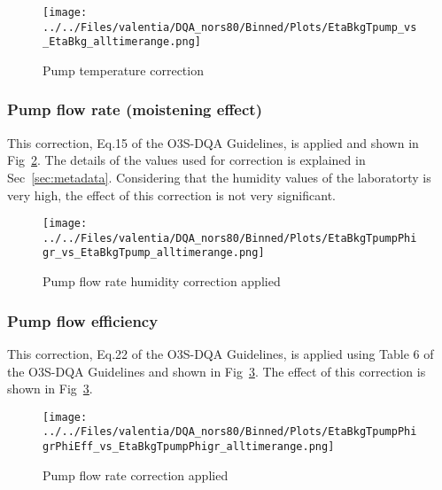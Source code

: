 \documentclass{article}
\begin{document}
%
                    \begin{figure}
        \centering
\texttt{[image: ../../Files/valentia/DQA\_nors80/Binned/Plots/EtaBkgTpump\_vs\_EtaBkg\_alltimerange.png]}
    \caption{Pump temperature correction }
            \label{fig:tpump}
    \end{figure}
                \subsubsection{Pump flow rate (moistening effect)}
    This correction, Eq.15 of the O3S-DQA Guidelines, is applied and shown in Fig~\ref{fig:pf_ptu}. The details of the
values used for correction is explained in Sec~\ref{sec:metadata}. Considering that the humidity values of the laboratorty
is very high, the effect of this correction is not very significant.
%
                        \begin{figure}
        \centering
\texttt{[image: ../../Files/valentia/DQA\_nors80/Binned/Plots/EtaBkgTpumpPhigr\_vs\_EtaBkgTpump\_alltimerange.png]}
    \caption{Pump flow rate humidity correction applied}
            \label{fig:pf_ptu}
    \end{figure}
                   \subsubsection{Pump flow efficiency}
    This correction, Eq.22 of the O3S-DQA Guidelines, is applied using Table 6 of the O3S-DQA Guidelines and
    shown in Fig~\ref{fig:pf_eff}.
The effect of this correction is shown in Fig~\ref{fig:pf_eff}.
%
                        \begin{figure}
        \centering
\texttt{[image: ../../Files/valentia/DQA\_nors80/Binned/Plots/EtaBkgTpumpPhigrPhiEff\_vs\_EtaBkgTpumpPhigr\_alltimerange.png]}
    \caption{Pump flow rate correction applied}
            \label{fig:pf_eff}
    \end{figure}
\end{document}
